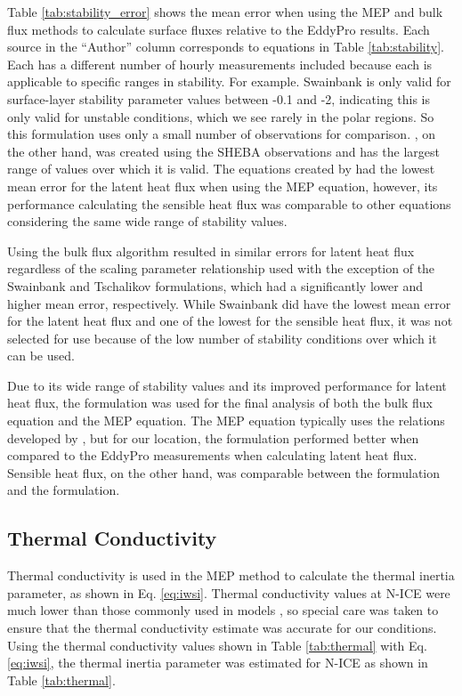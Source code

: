 Table \ref{tab:stability_error} shows the mean error when using the MEP and bulk flux methods to calculate surface fluxes relative to the EddyPro results. Each source in the ``Author'' column corresponds to equations in Table \ref{tab:stability}. Each has a different number of hourly measurements included because each is applicable to specific ranges in stability. For example. Swainbank \citep{foken:2008} is only valid for surface-layer stability parameter values between -0.1 and -2, indicating this is only valid for unstable conditions, which we see rarely in the polar regions. So this formulation uses only a small number of observations for comparison. \citet{andreas:311}, on the other hand, was created using the SHEBA observations and has the largest range of values over which it is valid. The equations created by \citet{andreas:311} had the lowest mean error for the latent heat flux when using the MEP equation, however, its performance calculating the sensible heat flux was comparable to other equations considering the same wide range of stability values. 

Using the bulk flux algorithm resulted in similar errors for latent heat flux regardless of the scaling parameter relationship used with the exception of the Swainbank and Tschalikov \citep{foken:2008} formulations, which had a significantly lower and higher mean error, respectively. While Swainbank \citep{foken:2008} did have the lowest mean error for the latent heat flux and one of the lowest for the sensible heat flux, it was not selected for use because of the low number of stability conditions over which it can be used.  

Due to its wide range of stability values and its improved performance for latent heat flux, the \citet{andreas:2010} formulation was used for the final analysis of both the bulk flux equation and the MEP equation. The MEP equation typically uses the relations developed by \citet{businger:1971}, but for our location, the \citet{andreas:311} formulation performed better when compared to the EddyPro measurements when calculating latent heat flux. Sensible heat flux, on the other hand, was comparable between the \citet{andreas:311} formulation and the \citet{businger:1971} formulation. 

\subsection{Thermal Conductivity}
Thermal conductivity is used in the MEP method to calculate the thermal inertia parameter, as shown in Eq. \ref{eq:iwsi}. Thermal conductivity values at N-ICE were much lower than those commonly used in models \citep{merkouriadi:2017}, so special care was taken to ensure that the thermal conductivity estimate was accurate for our conditions. Using the thermal conductivity values shown in Table \ref{tab:thermal} with Eq. \ref{eq:iwsi}, the thermal inertia parameter was estimated for N-ICE as shown in Table \ref{tab:thermal}. 

